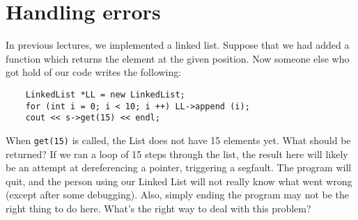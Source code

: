\section{Handling errors}
In previous lectures, we implemented a linked list.
Suppose that we had added a function 
 which returns the element at the given
position. 
Now someone else who got hold of our code writes the following:

\begin{verbatim}
    LinkedList *LL = new LinkedList;
    for (int i = 0; i < 10; i ++) LL->append (i);
    cout << s->get(15) << endl;
\end{verbatim}

When \texttt{get(15)} is called, the List does not have 15 elements
yet. What should be returned?
If we ran a loop of 15 steps through the list, the result here will
likely be an attempt at dereferencing a  pointer,
triggering a segfault.
The program will quit, and the person using our Linked List will not
really know what went wrong (except after some debugging). 
Also, simply ending the program may not be the right thing to do here.
What's the right way to deal with this problem?


